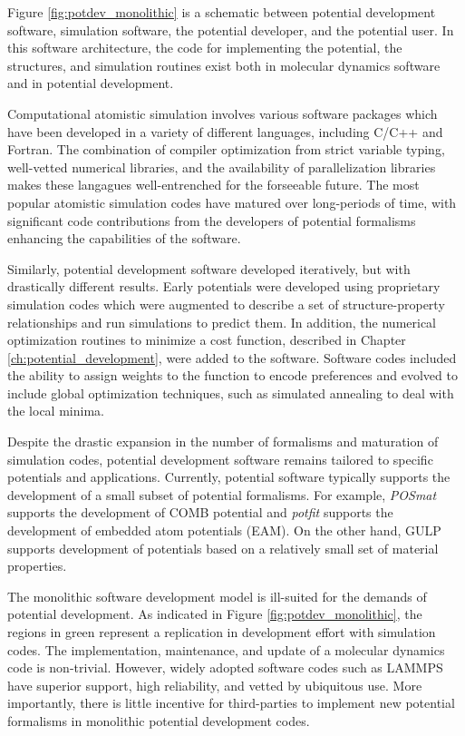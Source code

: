 Figure \ref{fig:potdev_monolithic} is a schematic between potential development software, simulation software, the potential developer, and the potential user.  In this software architecture, the code for implementing the potential, the structures, and simulation routines exist both in molecular dynamics software and in potential development.

Computational atomistic simulation involves various software packages which have been developed in a variety of different languages, including C/C++ and Fortran.  The combination of compiler optimization from strict variable typing, well-vetted numerical libraries, and the availability of parallelization libraries makes these langagues well-entrenched for the forseeable future.  The most popular atomistic simulation codes have matured over long-periods of time, with significant code contributions from the developers of potential formalisms enhancing the capabilities of the software.

Similarly, potential development software developed iteratively, but with drastically different results.  Early potentials were developed using proprietary simulation codes which were augmented to describe a set of structure-property relationships and run simulations to predict them.   In addition, the numerical optimization routines to minimize a cost function, described in Chapter \ref{ch:potential_development}, were added to the software.  Software codes included the ability to assign weights to the function to encode preferences and evolved to include global optimization techniques, such as simulated annealing\cite{kirkpatrick1983_simmulated_annealing} to deal with the local minima.

Despite the drastic expansion in the number of formalisms and maturation of simulation codes, potential development software remains tailored to specific potentials and applications.
Currently, potential software typically supports the development of a small subset of potential formalisms.
For example, \emph{POSmat}\cite{martinez2016_posmat} supports the development of COMB potential and \emph{potfit}\cite{brommer2015_potfit} supports the development of embedded atom potentials (EAM).  On the other hand, GULP supports development of potentials based on a relatively small set of material properties.

The monolithic software development model is ill-suited for the demands of potential development.  As indicated in Figure \ref{fig:potdev_monolithic}, the regions in green represent a replication in development effort with simulation codes.  The implementation, maintenance, and update of a molecular dynamics code is non-trivial.  However, widely adopted software codes such as LAMMPS have superior support, high reliability, and vetted by ubiquitous use.  More importantly,  there is little incentive for third-parties to implement new potential formalisms in monolithic potential development codes.

